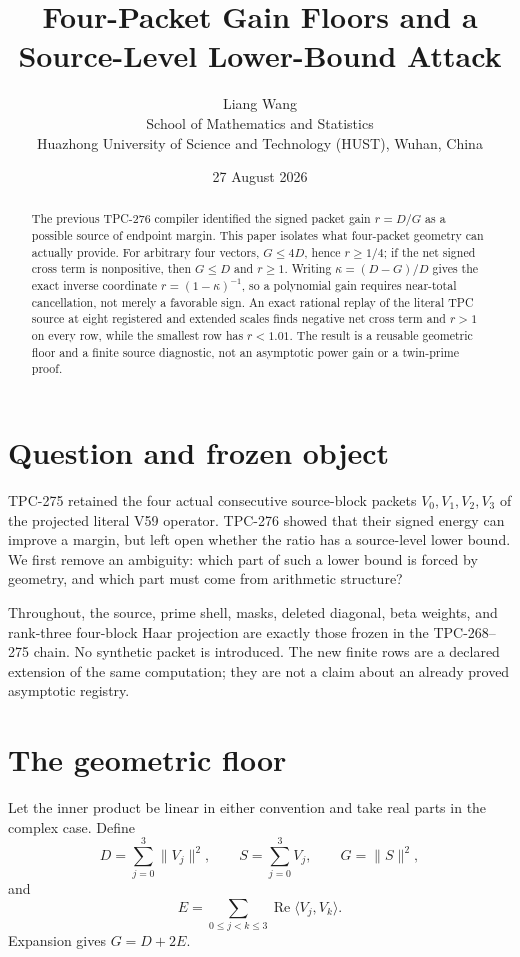 \documentclass[11pt]{article}
\title{Four-Packet Gain Floors and a Source-Level Lower-Bound Attack}
\author{Liang Wang\\
School of Mathematics and Statistics\\
Huazhong University of Science and Technology (HUST), Wuhan, China}
\date{27 August 2026}
\begin{document}
\maketitle

\begin{abstract}
The previous TPC-276 compiler identified the signed packet gain
$r=D/G$ as a possible source of endpoint margin.  This paper isolates what
four-packet geometry can actually provide.  For arbitrary four vectors,
$G\leq 4D$, hence $r\geq 1/4$; if the net signed cross term is nonpositive,
then $G\leq D$ and $r\geq 1$.  Writing
$\kappa=(D-G)/D$ gives the exact inverse coordinate
$r=(1-\kappa)^{-1}$, so a polynomial gain requires near-total cancellation,
not merely a favorable sign.  An exact rational replay of the literal
TPC source at eight registered and extended scales finds negative net cross
term and $r>1$ on every row, while the smallest row has $r<1.01$.
The result is a reusable geometric floor and a finite source diagnostic, not
an asymptotic power gain or a twin-prime proof.
\end{abstract}

\section{Question and frozen object}

TPC-275 retained the four actual consecutive source-block packets
$V_0,V_1,V_2,V_3$ of the projected literal V59 operator.  TPC-276 showed
that their signed energy can improve a margin, but left open whether the
ratio has a source-level lower bound.  We first remove an ambiguity: which
part of such a lower bound is forced by geometry, and which part must come
from arithmetic structure?

Throughout, the source, prime shell, masks, deleted diagonal, beta weights,
and rank-three four-block Haar projection are exactly those frozen in the
TPC-268--275 chain.  No synthetic packet is introduced.  The new finite rows
are a declared extension of the same computation; they are not a claim about
an already proved asymptotic registry.

\section{The geometric floor}

Let the inner product be linear in either convention and take real parts in
the complex case.  Define
\[
 D=\sum_{j=0}^3\|V_j\|^2,\qquad
 S=\sum_{j=0}^3V_j,\qquad G=\|S\|^2,
\]
and
\[
 E=\sum_{0\leq j<k\leq3}\operatorname{Re}\langle V_j,V_k\rangle.
\]
Expansion gives $G=D+2E$.
\end{document}
